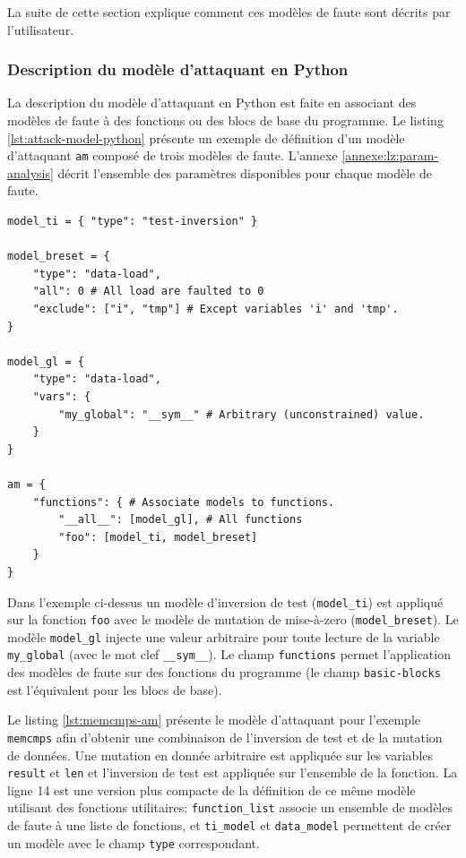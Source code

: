             La suite de cette section explique comment ces modèles de faute sont décrits par l'utilisateur. 
        
            \subsubsection{Description du modèle d'attaquant en Python}
            \label{sec:lazart-am-py}
            
                La description du modèle d'attaquant en Python est faite en associant des modèles de faute à des fonctions ou des blocs de base du programme.
                Le listing \ref{lst:attack-model-python} présente un exemple de définition d'un modèle d'attaquant \texttt{am} composé de trois modèles de faute.
                L'annexe \ref{annexe:lz:param-analysis} décrit l'ensemble des paramètres disponibles pour chaque modèle de faute.
                
\begin{lstlisting}  
model_ti = { "type": "test-inversion" }

model_breset = { 
    "type": "data-load",
    "all": 0 # All load are faulted to 0
    "exclude": ["i", "tmp"] # Except variables 'i' and 'tmp'.
}

model_gl = {
    "type": "data-load",
    "vars": {
        "my_global": "__sym__" # Arbitrary (unconstrained) value.
    }
}

am = {
    "functions": { # Associate models to functions.
        "__all__": [model_gl], # All functions
        "foo": [model_ti, model_breset]
    }
}
\end{lstlisting} 
                
                Dans l'exemple ci-dessus un modèle d'inversion de test (\texttt{model\_ti}) est appliqué sur la fonction \texttt{foo} avec le modèle de mutation de mise-à-zero (\texttt{model\_breset}). Le modèle \texttt{model\_gl} injecte une valeur arbitraire pour toute lecture de la variable \texttt{my\_global} (avec le mot clef \texttt{\_\_sym\_\_}). 
                Le champ \texttt{functions} permet l'application des modèles de faute sur des fonctions du programme (le champ \texttt{basic-blocks} est l'équivalent pour les blocs de base).
                
                Le listing \ref{lst:memcmps-am} présente le modèle d'attaquant pour l'exemple \texttt{memcmps} afin d'obtenir une combinaison de l'inversion de test et de la mutation de données. Une mutation en donnée arbitraire est appliquée sur les variables \texttt{result} et \texttt{len} et l'inversion de test est appliquée sur l'ensemble de la fonction.
                La ligne 14 est une version plus compacte de la définition de ce même modèle utilisant des fonctions utilitaires: \texttt{function\_list} associe un ensemble de modèles de faute à une liste de fonctions, et \texttt{ti\_model} et \texttt{data\_model} permettent de créer un modèle avec le champ \texttt{type} correspondant.
                
